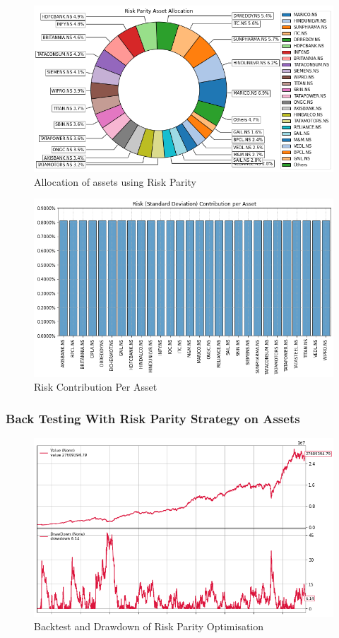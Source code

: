 \begin{figure}[H]
\centering
   \includegraphics[width=1.0\textwidth]{RP/Allocation.png}
      \caption{Allocation of assets using Risk Parity}
       \label{RP_Alloc}
\end{figure}

\begin{figure}[H]
\centering
   \includegraphics[width=1.0\textwidth]{RP/Risk.png}
      \caption{Risk Contribution Per Asset}
       \label{RP_Risk}
\end{figure}

\subsubsection{Back Testing With Risk Parity Strategy on Assets}

\begin{figure}[H]
\centering
   \includegraphics[width=1.0\textwidth]{RP/backtest.png}
      \caption{Backtest and Drawdown of Risk Parity Optimisation
}
       \label{fig:RP_assets}
\end{figure}

